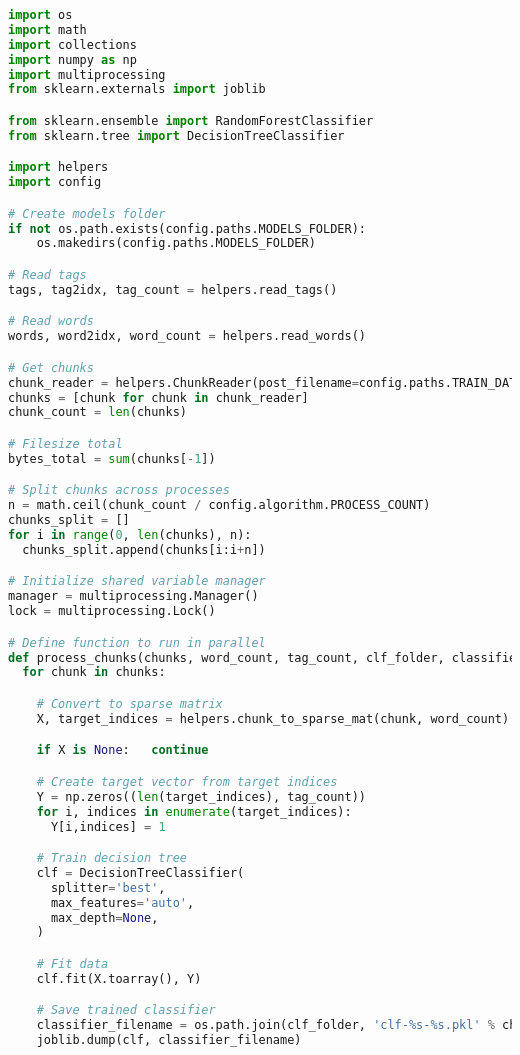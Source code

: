 \begin{lstlisting}[language=python]
import os
import math
import collections
import numpy as np
import multiprocessing
from sklearn.externals import joblib

from sklearn.ensemble import RandomForestClassifier
from sklearn.tree import DecisionTreeClassifier

import helpers
import config

# Create models folder
if not os.path.exists(config.paths.MODELS_FOLDER):
    os.makedirs(config.paths.MODELS_FOLDER)

# Read tags
tags, tag2idx, tag_count = helpers.read_tags()

# Read words
words, word2idx, word_count = helpers.read_words()

# Get chunks
chunk_reader = helpers.ChunkReader(post_filename=config.paths.TRAIN_DATA_IDX, chunk_size=config.data.CHUNK_SIZE_TREES) # TODO: Change
chunks = [chunk for chunk in chunk_reader]
chunk_count = len(chunks)

# Filesize total
bytes_total = sum(chunks[-1])

# Split chunks across processes
n = math.ceil(chunk_count / config.algorithm.PROCESS_COUNT)
chunks_split = []
for i in range(0, len(chunks), n):
  chunks_split.append(chunks[i:i+n])

# Initialize shared variable manager
manager = multiprocessing.Manager()
lock = multiprocessing.Lock()

# Define function to run in parallel
def process_chunks(chunks, word_count, tag_count, clf_folder, classifier_filenames, bytes_processed, bytes_total, lock):
  for chunk in chunks:

    # Convert to sparse matrix
    X, target_indices = helpers.chunk_to_sparse_mat(chunk, word_count)

    if X is None:   continue

    # Create target vector from target indices
    Y = np.zeros((len(target_indices), tag_count))
    for i, indices in enumerate(target_indices):
      Y[i,indices] = 1

    # Train decision tree
    clf = DecisionTreeClassifier(
      splitter='best',
      max_features='auto',
      max_depth=None,
    )

    # Fit data
    clf.fit(X.toarray(), Y)

    # Save trained classifier
    classifier_filename = os.path.join(clf_folder, 'clf-%s-%s.pkl' % chunk)
    joblib.dump(clf, classifier_filename)


\end{lstlisting}
